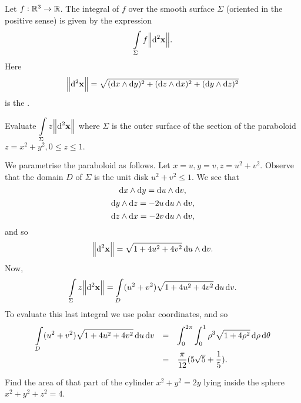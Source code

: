 \begin{df}
Let $f:\mathbb{R}^3\rightarrow \mathbb{R}$. The integral of $f$ over the
smooth surface $\Sigma$ (oriented in the positive sense) is given by
the expression  $$\dint \limits_\Sigma f \norm{\d{ ^2\vector{x}}}.$$Here
$$\norm{\d{ ^2\vector{x}}} = \sqrt{(\d{x} \wedge \d{y})^2 + (\d{z} \wedge \d{x})^2 + (\d{y} \wedge \d{z})^2}$$
is the .
\end{df}
\begin{exa}
Evaluate $\dint \limits_\Sigma z\norm{\d{ ^2\vector{x}}}$ where
$\Sigma$ is the outer surface of the section of the paraboloid $z =
x^2 + y^2, 0 \leq z \leq 1.$
\end{exa}
\begin{solu} We parametrise the paraboloid as follows. Let $x = u, y = v, z
= u^2 + v^2.$ Observe that the domain $D$ of $\Sigma$ is the unit
disk $u^2 + v^2 \leq 1$. We see that
$$\d{x} \wedge \d{y} =   \d{u}\wedge \d{v},$$
$$\d{y} \wedge \d{z}  = -2u \d{u}\wedge \d{v}, $$
$$\d{z} \wedge \d{x}  = -2v \d{u}\wedge \d{v},
$$and so
$$\norm{\d{ ^2\vector{x}}} = \sqrt{1 + 4u^2 + 4v^2}\d{u} \wedge \d{v} .$$
Now,
$$\dint \limits_\Sigma z \norm{\d{ ^2\vector{x}}}= \dint \limits_D (u^2 + v^2)\sqrt{1 + 4u^2 + 4v^2}\d{u}\d{v}.
$$To evaluate this last integral we use polar coordinates, and
so
$$\begin{array}{lll}\dint \limits_D (u^2 + v^2)\sqrt{1 + 4u^2 + 4v^2}\d{u}
\d{v} & = & \dint _0 ^{2\pi} \dint _0 ^1 \rho^3 \sqrt{1 +
4\rho^2} \d{\rho} \d{\theta} \\
& = & \dfrac{\pi}{12}(5\sqrt{5} + \dfrac{1}{5}).
\end{array}$$
\end{solu}
\begin{exa} Find the area of that part of the cylinder $x^2 +
y^2 = 2y$ lying inside the sphere $x^2+y^2+z^2=4$. \end{exa}
